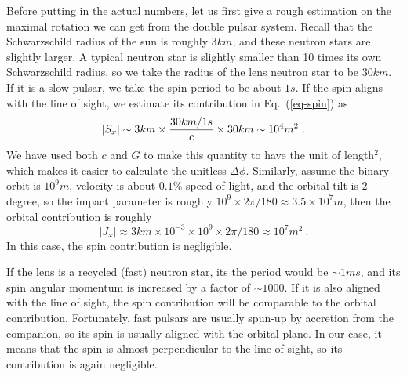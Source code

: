 \documentclass[aps,showpacs,twocolumn,floats,prd,superscriptaddress,nofootinbib]{revtex4-1}
\begin{document}
Before putting in the actual numbers, let us first give a rough estimation on the maximal rotation we can get from the double pulsar system.
Recall that the Schwarzschild radius of the sun is roughly $3km$, and these neutron stars are slightly larger.
A typical neutron star is slightly smaller than 10 times its own Schwarzschild radius, so we take the radius of the lens neutron star to be $30km$.
If it is a slow pulsar, we take the spin period to be about $1s$.
If the spin aligns with the line of sight, we estimate its contribution in Eq.~(\ref{eq-spin}) as
\begin{equation}
|S_x|  \sim  3km \times \frac{30km/1s}{c} \times 30km \sim 10^4 m^2~. \nonumber \\
{\color{red}   
}
\end{equation}
We have used both $c$ and $G$ to make this quantity to have the unit of length$^2$, which makes it easier to calculate the unitless $\Delta\phi$.
Similarly, assume the binary orbit is $10^9 m$, velocity is about $0.1\%$ speed of light, and the orbital tilt is $2$ degree, so the impact parameter is roughly $10^9 \times 2\pi/180 \approx 3.5 \times 10^7 m$, then the orbital contribution is roughly
\begin{equation}
|J_x| \approx  3km \times 10^{-3} \times 10^9 \times 2\pi/180  \approx 10^7 m^2~.
\end{equation}
In this case, the spin contribution is negligible.

If the lens is a recycled (fast) neutron star, its the period would be $\sim 1ms$, and its spin angular momentum is increased by a factor of $\sim1000$.
If it is also aligned with the line of sight, the spin contribution will be comparable to the orbital contribution.
Fortunately, fast pulsars are usually spun-up by accretion from the companion, so its spin is usually aligned with the orbital plane.
In our case, it means that the spin is almost perpendicular to the line-of-sight, so its contribution is again negligible.
\end{document}
